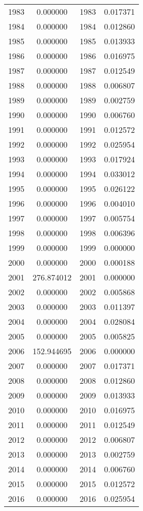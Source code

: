 \documentclass[12pt]{article}
\begin{document}
\begin{longtable}{@{}cccc@{}}
1983 & 0.000000 & 1983 & 0.017371 \\
1984 & 0.000000 & 1984 & 0.012860 \\
1985 & 0.000000 & 1985 & 0.013933 \\
1986 & 0.000000 & 1986 & 0.016975 \\
1987 & 0.000000 & 1987 & 0.012549 \\
1988 & 0.000000 & 1988 & 0.006807 \\
1989 & 0.000000 & 1989 & 0.002759 \\
1990 & 0.000000 & 1990 & 0.006760 \\
1991 & 0.000000 & 1991 & 0.012572 \\
1992 & 0.000000 & 1992 & 0.025954 \\
1993 & 0.000000 & 1993 & 0.017924 \\
1994 & 0.000000 & 1994 & 0.033012 \\
1995 & 0.000000 & 1995 & 0.026122 \\
1996 & 0.000000 & 1996 & 0.004010 \\
1997 & 0.000000 & 1997 & 0.005754 \\
1998 & 0.000000 & 1998 & 0.006396 \\
1999 & 0.000000 & 1999 & 0.000000 \\
2000 & 0.000000 & 2000 & 0.000188 \\
2001 & 276.874012 & 2001 & 0.000000 \\
2002 & 0.000000 & 2002 & 0.005868 \\
2003 & 0.000000 & 2003 & 0.011397 \\
2004 & 0.000000 & 2004 & 0.028084 \\
2005 & 0.000000 & 2005 & 0.005825 \\
2006 & 152.944695 & 2006 & 0.000000 \\
2007 & 0.000000 & 2007 & 0.017371 \\
2008 & 0.000000 & 2008 & 0.012860 \\
2009 & 0.000000 & 2009 & 0.013933 \\
2010 & 0.000000 & 2010 & 0.016975 \\
2011 & 0.000000 & 2011 & 0.012549 \\
2012 & 0.000000 & 2012 & 0.006807 \\
2013 & 0.000000 & 2013 & 0.002759 \\
2014 & 0.000000 & 2014 & 0.006760 \\
2015 & 0.000000 & 2015 & 0.012572 \\
2016 & 0.000000 & 2016 & 0.025954 \\

\end{longtable}
\end{document}
